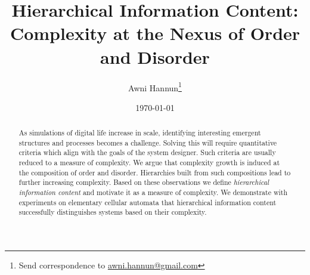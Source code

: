 \documentclass[12pt]{article}
\title{Hierarchical Information Content:\\
    Complexity at the Nexus of Order and Disorder}
\author{Awni Hannun\footnote{
  Send correspondence to
  \href{mailto:awni.hannun@gmail.com}{awni.hannun@gmail.com}}}
\date{\today}
\theoremstyle{definition}
\begin{document}
\maketitle

\begin{abstract}
  As simulations of digital life increase in scale, identifying interesting
    emergent structures and processes becomes a challenge.  Solving this will
    require quantitative criteria which align with the goals of the system
    designer. Such criteria are usually reduced to a measure of complexity. We
    argue that complexity growth is induced at the composition of order and
    disorder. Hierarchies built from such compositions lead to further
    increasing complexity. Based on these observations we define
    \emph{hierarchical information content} and motivate it as a measure of
    complexity. We demonstrate with experiments on elementary cellular automata
    that hierarchical information content successfully distinguishes systems
    based on their complexity.
\end{abstract}









\end{document}
